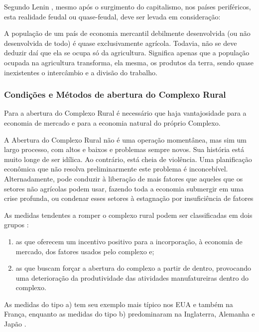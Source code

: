 \documentclass[
	12pt,				%
	oneside,			%
	a4paper,			%
	chapter=TITLE,		%
	section=TITLE,		%
	english,			%
	brazil				%
	]{abntex2}
\begin{document}
Segundo Lenin \autocite[\emph{apud}][99]{rangel1954}, mesmo após o
surgimento do capitalismo, nos países periféricos, esta realidade feudal
ou quase-feudal, deve ser levada em consideração:
\begin{citacao} 
A população de um país de economia mercantil debilmente desenvolvida (ou não 
desenvolvida de todo) é quase exclusivamente agrícola. Todavia, não se deve 
deduzir daí que ela se ocupa só da agricultura. Significa apenas que a população 
ocupada na agricultura transforma, ela mesma, os produtos da terra, sendo quase 
inexistentes o intercâmbio e a divisão do trabalho. 
\end{citacao}
\subsubsection{Condições e Métodos de abertura do Complexo
Rural}\label{condiuxe7uxf5es-e-muxe9todos-de-abertura-do-complexo-rural}

Para a abertura do Complexo Rural é necessário que haja vantajosidade
para a economia de mercado e para a economia natural do próprio
Complexo.
\begin{citacao} 
A Abertura do Complexo Rural não é uma operação momentânea, mas sim um largo
processo, com altos e baixos e problemas sempre novos. Sua história está muito
longe de ser idílica. Ao contrário, está cheia de violência. Uma planificação
econômica que não resolva preliminarmente este problema é inconcebível.
Alternadamente, pode conduzir à liberação de mais fatores que aqueles que os
setores não agrícolas podem usar, fazendo toda a economia submergir em uma crise
profunda, ou condenar esses setores à estagnação por insuficiência de
fatores \cite[p.~118]{rangel1954}
\end{citacao}
As medidas tendentes a romper o complexo rural podem ser classificadas
em dois grupos \autocite[113]{rangel1954}:
\begin{enumerate}
\def\labelenumi{\alph{enumi}.}
\item
  as que oferecem um incentivo positivo para a incorporação, à economia
  de mercado, dos fatores usados pelo complexo e;
\item
  as que buscam forçar a abertura do complexo a partir de dentro,
  provocando uma deterioração da produtividade das atividades
  manufatureiras dentro do complexo.
\end{enumerate}
As medidas do tipo a) tem seu exemplo mais típico nos EUA e também na
França, enquanto as medidas do tipo b) predominaram na Inglaterra,
Alemanha e Japão \autocite[114-115]{rangel1954}.
\end{document}
